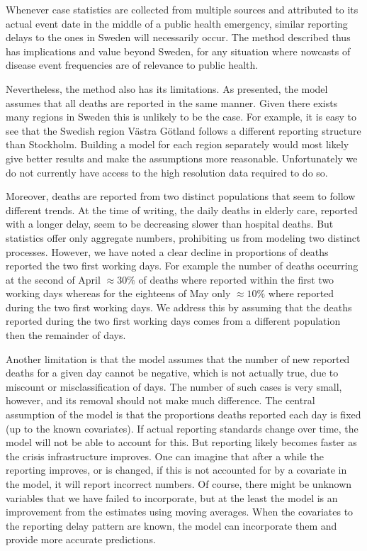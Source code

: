 \documentclass[a4paper,11pth]{article}
\begin{document}
Whenever case statistics are collected from multiple sources and attributed to its actual event date in the middle of a public health emergency, similar reporting delays to the ones in Sweden will necessarily occur. The method described thus has implications and value beyond Sweden, for any situation where nowcasts of disease event frequencies are of relevance to public health.

Nevertheless, the method also has its limitations. As presented, the model assumes that all deaths are reported in the same manner. Given there exists many regions in Sweden this is unlikely to be the case. For example, it is easy to see that the Swedish region Västra Götland follows a different reporting structure than Stockholm. Building a model for each region separately would most likely give better results and make the assumptions more reasonable. Unfortunately we do not currently have access to the high resolution data required to do so. 

Moreover, deaths are reported from two distinct populations that seem to follow different trends. At the time of writing, the daily deaths in elderly care, reported with a longer delay, seem to be decreasing slower than hospital deaths. But statistics offer only aggregate numbers, prohibiting us from modeling two distinct processes. However, we have noted a clear decline in proportions of deaths reported the two first working days. For example the number of deaths occurring at the second of April $\approx 30\%$ of deaths where reported within the first two working days whereas for the eighteens of May only $\approx 10\%$ where reported during the two first working days. We address this by assuming that the deaths reported during the two first working days comes from a different population then the remainder of days.

Another limitation is that the model assumes that the number of new reported deaths for a given day cannot be negative, which is not actually true, due to miscount or misclassification of days. The number of such cases is very small, however, and its removal should not make much difference. The central assumption of the model is that the proportions deaths reported each day is fixed (up to the known covariates). If actual reporting standards change over time, the model will not be able to account for this. But reporting likely becomes faster as the crisis infrastructure improves. One can imagine that after a while the reporting improves, or is changed, if this is not accounted for by a covariate in the model, it will report incorrect numbers. Of course, there might be unknown variables that we have failed to incorporate, but at the least the model is an improvement from the estimates using moving averages. When the covariates to the reporting delay pattern are known, the model can incorporate them and provide more accurate predictions. 
\end{document}
